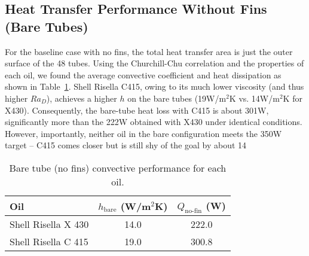 \documentclass[12pt]{article}
\begin{document}
\subsection{Heat Transfer Performance Without Fins (Bare Tubes)}
For the baseline case with no fins, the total heat transfer area is just the outer surface of the 48 tubes. Using the Churchill-Chu correlation and the properties of each oil, we found the average convective coefficient and heat dissipation as shown in Table~\ref{tab:noFin}. Shell Risella C415, owing to its much lower viscosity (and thus higher $Ra_D$), achieves a higher $h$ on the bare tubes (19W/m$^2$K vs. 14W/m$^2$K for X430). Consequently, the bare-tube heat loss with C415 is about 301W, significantly more than the 222W obtained with X430 under identical conditions. However, importantly, neither oil in the bare configuration meets the 350W target – C415 comes closer but is still shy of the goal by about 14%

\begin{table}[h!]
\centering
\caption{Bare tube (no fins) convective performance for each oil.}
\label{tab:noFin}
\begin{tabular}{lcc}
\toprule
Oil & $h_{\text{bare}}$ (W/m$^2$K) & $Q_{\text{no-fin}}$ (W) \\
\midrule
Shell Risella X 430 & 14.0 & 222.0 \\
Shell Risella C 415 & 19.0 & 300.8 \\
\bottomrule
\end{tabular}
\end{table}
\end{document}
